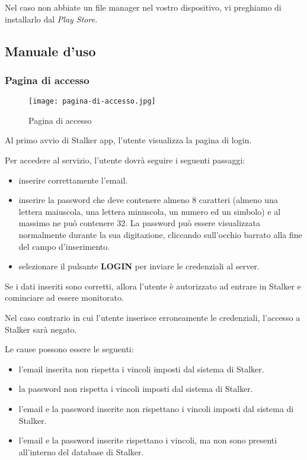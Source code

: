 \documentclass[../manuale-utente.tex]{subfiles}
\begin{document}
Nel caso non abbiate un file manager nel vostro dispositivo, vi preghiamo di installarlo dal \textit{Play Store}.
\newpage

\subsection{Manuale d'uso}%
\label{sub:manuale_uso_mobile}

\subsubsection{Pagina di accesso}%
\label{sub:pagina_di_accesso}

\begin{figure}[H]
    \centering
    \texttt{[image: pagina-di-accesso.jpg]}
    \caption{Pagina di accesso}%
    \label{fig:mobile_app_pagina_di_accesso}
\end{figure}

Al primo avvio di Stalker app, l'utente visualizza la pagina di login.

Per accedere al servizio, l'utente dovrà seguire i seguenti passaggi:
\begin{itemize}
    \item inserire correttamente l'email.
    \item inserire la password che deve contenere almeno 8 caratteri (almeno una lettera maiuscola, una lettera minuscola, un numero ed un simbolo) e al massimo ne può contenere 32. La password può essere visualizzata normalmente durante la sua digitazione, cliccando sull'occhio barrato alla fine del campo d'inserimento.
    \item selezionare il pulsante \textbf{LOGIN} per inviare le credenziali al server.
\end{itemize}

Se i dati inseriti sono corretti, allora l'utente è autorizzato ad entrare in Stalker e cominciare ad essere monitorato.

Nel caso contrario in cui l'utente inserisce erroneamente le credenziali, l'accesso a Stalker sarà negato.

Le cause possono essere le seguenti:
\begin{itemize}
    \item l'email inserita non rispetta i vincoli imposti dal sistema di Stalker.
    \item la password non rispetta i vincoli imposti dal sistema di Stalker.
    \item l'email e la password inserite non rispettano i vincoli imposti dal sistema di Stalker.
    \item l'email e la password inserite rispettano i vincoli, ma non sono presenti all'interno del database di Stalker.
\end{itemize}
\end{document}
